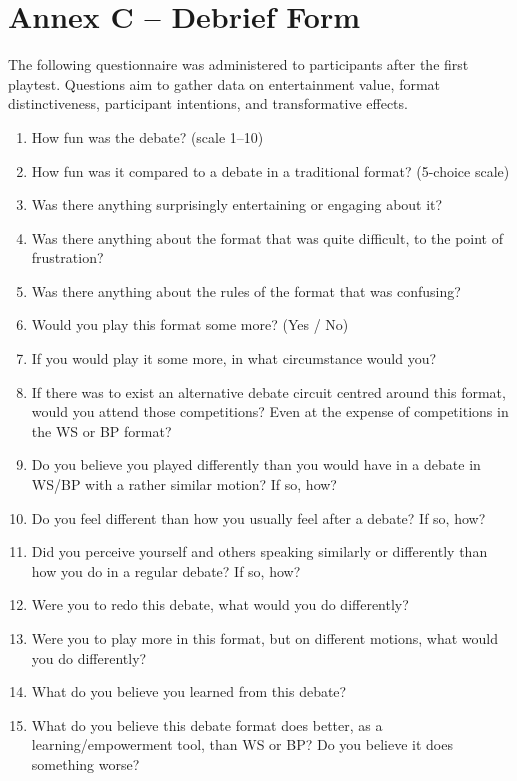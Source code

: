 \section*{Annex C -- Debrief Form}

The following questionnaire was administered to participants after the first playtest. Questions aim to gather data on entertainment value, format distinctiveness, participant intentions, and transformative effects.

\begin{enumerate}
    \item How fun was the debate? (scale 1--10)
    \item How fun was it compared to a debate in a traditional format? (5-choice scale)
    \item Was there anything surprisingly entertaining or engaging about it?
    \item Was there anything about the format that was quite difficult, to the point of frustration?
    \item Was there anything about the rules of the format that was confusing?
    \item Would you play this format some more? (Yes / No)
    \item If you would play it some more, in what circumstance would you?
    \item If there was to exist an alternative debate circuit centred around this format, would you attend those competitions? Even at the expense of competitions in the WS or BP format?
    \item Do you believe you played differently than you would have in a debate in WS/BP with a rather similar motion? If so, how?
    \item Do you feel different than how you usually feel after a debate? If so, how?
    \item Did you perceive yourself and others speaking similarly or differently than how you do in a regular debate? If so, how?
    \item Were you to redo this debate, what would you do differently?
    \item Were you to play more in this format, but on different motions, what would you do differently?
    \item What do you believe you learned from this debate?
    \item What do you believe this debate format does better, as a learning/empowerment tool, than WS or BP? Do you believe it does something worse?
\end{enumerate}

